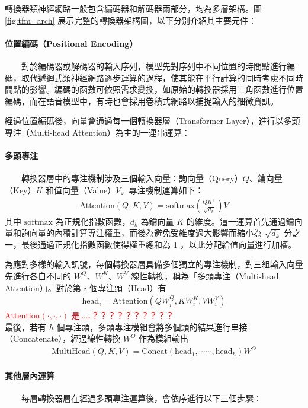         轉換器類神經網路一般包含編碼器和解碼器兩部分，均為多層架構。圖 \ref{fig:tfm_arch} 展示完整的轉換器架構圖，以下分別介紹其主要元件：

\paragraph{位置編碼（Positional Encoding）} \hfill \break
%
　　對於編碼器或解碼器的輸入序列，模型先對序列中不同位置的時間點進行編碼，取代遞迴式類神經網路逐步運算的過程，使其能在平行計算的同時考慮不同時間點的影響。編碼的函數可依照需求變換，如原始的轉換器採用三角函數進行位置編碼，而在語音模型中，有時也會採用卷積式網路以捕捉輸入的細微資訊。

        經過位置編碼後，向量會通過每一個轉換器層（Transformer Layer），進行以多頭專注（Multi-head Attention）為主的一連串運算：

\paragraph{多頭專注} \hfill \break
%
　　轉換器層中的專注機制涉及三個輸入向量：詢向量（Query）$Q$、鑰向量（Key）$K$ 和值向量（Value）$V$。專注機制運算如下：
\begin{align}
    \text{Attention}(Q, K, V) = \text{softmax}
    \left(
    \frac{QK^\top}{\sqrt{d_k}}
    \right)
    V
\end{align}
其中 $\text{softmax}$ 為正規化指數函數，$d_k$ 為鑰向量 $K$ 的維度。這一運算首先通過鑰向量和詢向量的內積計算專注權重，而後為避免受維度過大影響而縮小為 $\sqrt{d_k}$ 分之一，最後通過正規化指數函數使得權重總和為 1 ，以此分配給值向量進行加權。

        為應對多樣的輸入訊號，每個轉換器層具備多個獨立的專注機制，對三組輸入向量先進行各自不同的 $W^Q$、$W^K$、$W^V$ 線性轉換，稱為「多頭專注（Multi-head Attention）」。對於第 $i$ 個專注頭（Head）有
\begin{align}
    \text{head}_i = \text{Attention}(QW^Q_i,KW^K_i,VW^V_i)
\end{align}
          \textcolor{red}{\(\text{Attention}(\cdot, \cdot, \cdot)\) 是……？？？？？？？？？？} \\
最後，若有 $h$ 個專注頭，多頭專注模組會將多個頭的結果進行串接（Concatenate），經過線性轉換 $W^O$ 作為模組輸出
\begin{align}
    \text{MultiHead}(Q, K, V) = \text{Concat}(\text{head}_1, \cdots\cdots, \text{head}_h) W^O
\end{align}

\paragraph{其他層內運算} \hfill \break
%
　　每層轉換器層在經過多頭專注運算後，會依序進行以下三個步驟：

